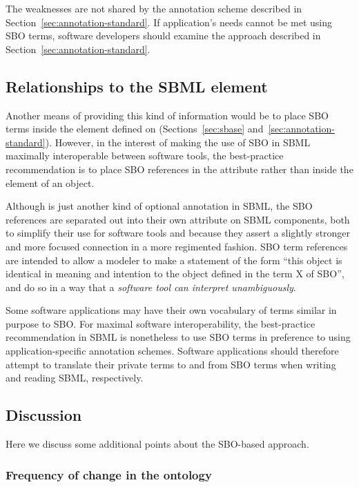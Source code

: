 The weaknesses are not shared by the annotation scheme described
in Section~\ref{sec:annotation-standard}.  If application's
needs cannot be met using SBO terms, software developers should
examine the approach described in
Section~\ref{sec:annotation-standard}.

\subsection{Relationships to the SBML  element}

Another means of providing this kind of information would be to
place SBO terms inside the  element
defined on \SBase (Sections~\ref{sec:sbase} and~\ref{sec:annotation-standard}).
However, in the interest of making the use of SBO in SBML
maximally interoperable between software tools, the best-practice
recommendation is to place SBO references in the 
attribute rather than inside the 
element of an object.

Although  is just another kind of optional
annotation in SBML, the SBO references are separated out into
their own attribute on SBML components, both to simplify their use
for software tools and because they assert a slightly stronger and
more focused connection in a more regimented fashion.  SBO term
references are intended to allow a modeler to make a statement of
the form ``this object is identical in meaning and intention to
the object defined in the term X of SBO'', and do so in a way
that a \emph{software tool can interpret unambiguously}.

Some software applications may have their own vocabulary of terms
similar in purpose to SBO.  For maximal software interoperability,
the best-practice recommendation in SBML is nonetheless to use SBO
terms in preference to using application-specific annotation
schemes.  Software applications should therefore attempt to
translate their private terms to and from SBO terms when writing
and reading SBML, respectively.


\subsection{Discussion}

Here we discuss some additional points about the SBO-based
approach.

\subsubsection{Frequency of change in the ontology}
\label{sec:sbo-frequency-of-change}

